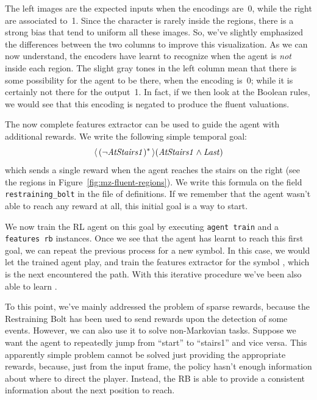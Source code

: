 The left images are the expected inputs when the encodings are~0, while
the right are associated to~1. Since the character is rarely inside the
regions, there is a strong bias that tend to uniform all these images. So,
we've slightly emphasized the differences between the two columns to improve
this visualization. As we can now understand, the encoders have learnt to
recognize when the agent is \emph{not} inside each region. The slight gray
tones in the left column mean that there is some possibility for the agent to
be there, when the encoding is~0; while it is certainly not there for the
output~1. In fact, if we then look at the Boolean rules, we would see that
this encoding is negated to produce the fluent valuations.

The now complete features extractor can be used to guide the agent with
additional rewards. We write the following simple temporal goal:
\begin{equation}
	\langle\, {(\neg \text{\textit{AtStairs1}})^*} \,\rangle(\text{\textit{AtStairs1}} \land \text{\textit{Last}})
\end{equation}
which sends a single reward when the agent reaches the stairs on the right
(see the regions in Figure~\ref{fig:mz-fluent-regions}). We write this formula
on the field \texttt{restraining\_bolt} in the file of definitions. If we
remember that the agent wasn't able to reach any reward at all, this initial
goal is a way to start.

We now train the RL agent on this goal by executing \verb|agent train| and a
\verb|features rb| instances. Once we see that the agent has learnt to reach
this first goal, we can repeat the previous process for a new symbol. In this
case, we would let the trained agent play, and train the features extractor
for the symbol , which is the next encountered the path.
With this iterative procedure we've been also able to learn .

To this point, we've mainly addressed the problem of sparse rewards, because
the Restraining Bolt has been used to send rewards upon the detection of some
events.  However, we can also use it to solve non-Markovian tasks.
Suppose we want the agent to repeatedly jump from ``start'' to ``stairs1'' and
vice versa. This apparently simple problem cannot be solved just providing the
appropriate rewards, because, just from the input frame, the policy hasn't
enough information about where to direct the player. Instead, the RB is able
to provide a consistent information about the next position to reach.

